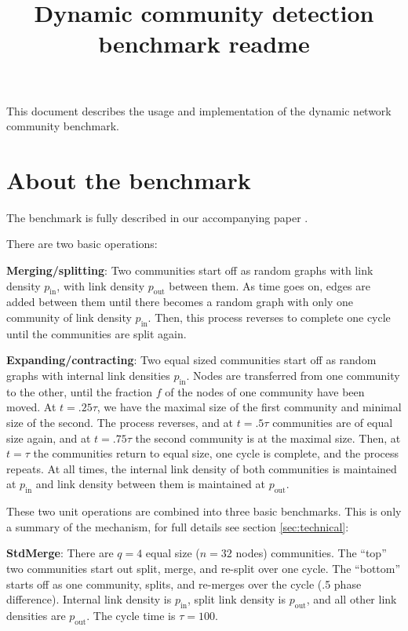\documentclass{article}
\title{Dynamic community detection benchmark readme}
\def\pin{p_\mathrm{in}}
\def\pout{p_\mathrm{out}}
\begin{document}
\maketitle

This document describes the usage and implementation of the dynamic network
community benchmark.





\section{About the benchmark}
\label{sec:about}

The benchmark is fully described in our accompanying paper \cite{xxx}.

\vspace{.5cm}

\noindent
There are two basic operations:

\textbf{Merging/splitting}: Two communities start off as random graphs
with link density $\pin$, with link density $\pout$ between them.  As
time goes on, edges are added between them until there becomes a
random graph with only one community of link density $\pin$.  Then,
this process reverses to complete one cycle until the communities are
split again.

\textbf{Expanding/contracting}: Two equal sized communities start off
as random graphs with internal link densities $\pin$.  Nodes are
transferred from one community to the other, until the fraction $f$ of
the nodes of one community have been moved.  At $t=.25\tau$, we have
the maximal size of the first community and minimal size of the
second.  The process reverses, and at $t=.5\tau$ communities are of
equal size again, and at $t=.75\tau$ the second community is at the
maximal size.  Then, at $t=\tau$ the communities return to equal size,
one cycle is complete, and the process repeats.  At all times, the
internal link density of both communities is maintained at $\pin$ and
link density between them is maintained at $\pout$.

\vspace{.5cm}

\noindent
These two unit operations are combined into three basic benchmarks.
This is only a summary of the mechanism, for full details see section
\ref{sec:technical}:

\textbf{StdMerge}: There are $q=4$ equal size ($n=32$ nodes)
communities.  The ``top'' two communities start out split, merge, and
re-split over one cycle.  The ``bottom'' starts off as one community,
splits, and re-merges over the cycle (.5 phase difference).  Internal
link density is $\pin$, split link density is $\pout$, and all other
link densities are $\pout$.  The cycle time is $\tau=100$.
\end{document}
